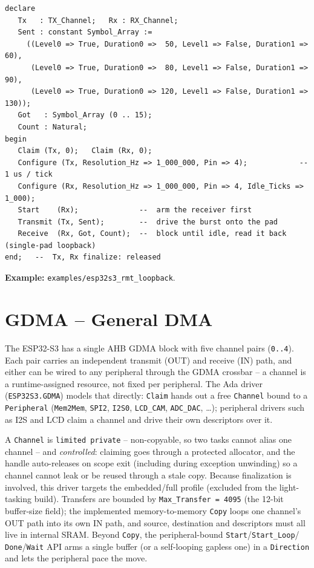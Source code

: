 \begin{lstlisting}
declare
   Tx   : TX_Channel;   Rx : RX_Channel;
   Sent : constant Symbol_Array :=
     ((Level0 => True, Duration0 =>  50, Level1 => False, Duration1 =>  60),
      (Level0 => True, Duration0 =>  80, Level1 => False, Duration1 =>  90),
      (Level0 => True, Duration0 => 120, Level1 => False, Duration1 => 130));
   Got   : Symbol_Array (0 .. 15);
   Count : Natural;
begin
   Claim (Tx, 0);   Claim (Rx, 0);
   Configure (Tx, Resolution_Hz => 1_000_000, Pin => 4);            --  1 us / tick
   Configure (Rx, Resolution_Hz => 1_000_000, Pin => 4, Idle_Ticks => 1_000);
   Start    (Rx);              --  arm the receiver first
   Transmit (Tx, Sent);        --  drive the burst onto the pad
   Receive  (Rx, Got, Count);  --  block until idle, read it back (single-pad loopback)
end;   --  Tx, Rx finalize: released
\end{lstlisting}

\noindent\textbf{Example:} \texttt{examples/esp32s3\_rmt\_loopback}.

\section{GDMA -- General DMA}
\label{app:int:gdma}

The ESP32-S3 has a single AHB GDMA block with five channel pairs (\texttt{0..4}).
Each pair carries an independent transmit (OUT) and receive (IN) path, and either
can be wired to any peripheral through the GDMA crossbar -- a channel is a
runtime-assigned resource, not fixed per peripheral. The Ada driver
(\texttt{ESP32S3.GDMA}) models that directly: \texttt{Claim} hands out a free
\texttt{Channel} bound to a \texttt{Peripheral} (\texttt{Mem2Mem}, \texttt{SPI2},
\texttt{I2S0}, \texttt{LCD\_CAM}, \texttt{ADC\_DAC}, \ldots); peripheral drivers
such as I2S and LCD claim a channel and drive their own descriptors over it.

A \texttt{Channel} is \texttt{limited private} -- non-copyable, so two tasks
cannot alias one channel -- and \emph{controlled}: claiming goes through a
protected allocator, and the handle auto-releases on scope exit (including during
exception unwinding) so a channel cannot leak or be reused through a stale copy.
Because finalization is involved, this driver targets the embedded/full profile
(excluded from the light-tasking build). Transfers are bounded by
\texttt{Max\_Transfer = 4095} (the 12-bit buffer-size field); the implemented
memory-to-memory \texttt{Copy} loops one channel's OUT path into its own IN path,
and source, destination and descriptors must all live in internal SRAM. Beyond
\texttt{Copy}, the peripheral-bound \texttt{Start}/\texttt{Start\_Loop}/%
\texttt{Done}/\texttt{Wait} API arms a single buffer (or a self-looping gapless
one) in a \texttt{Direction} and lets the peripheral pace the move.

